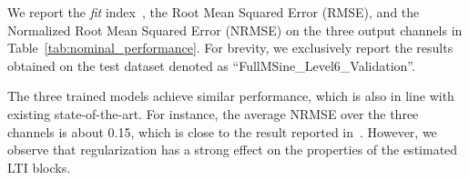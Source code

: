 \documentclass{article} %
\begin{document}
We report the \emph{fit} index~\cite{schoukens2019nonlinear}, the Root Mean Squared Error (RMSE), and the Normalized Root Mean Squared Error (NRMSE) on the three output channels in Table~\ref{tab:nominal_performance}. For brevity, we exclusively report the results obtained on the test dataset denoted as ``FullMSine\_Level6\_Validation''.
\begin{table}
\centering
\captionsetup{justification=centering} %
\setlength{\tabcolsep}{4pt} %
\caption{Performance of the SSM trained with different regularization methods.}
\label{tab:nominal_performance}
\end{table}
The three trained models achieve similar performance, which is also in line with existing state-of-the-art.
For instance, the average NRMSE over the three channels is about 0.15, which is close to the
result reported in~\cite{revay2023recurrent}.
However, we observe that regularization has a strong effect on the properties of the estimated LTI blocks.
\end{document}
